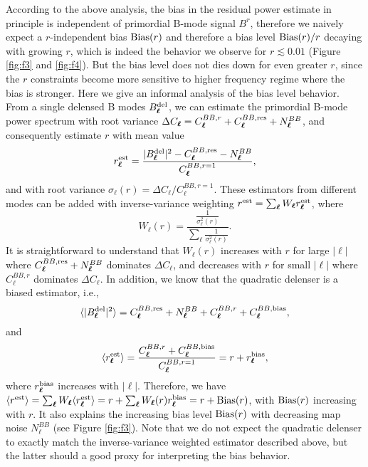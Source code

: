 \documentclass[aps, prd, reprint, nofootinbib, groupedaddress, showpacs]{revtex4-1}
\def\be{\begin{equation}}
\def\ee{\end{equation}}
\newcommand*\Bell{\ensuremath{\boldsymbol\ell}}
\begin{document}
According to the above analysis, the bias in the residual power estimate
in principle is independent of primordial B-mode signal $B^r$,
therefore we naively expect a $r$-independent bias ${\rm Bias}(r)$
and therefore a bias level ${\rm Bias}(r)/r$ decaying with growing $r$,
which is indeed the behavior we observe for
$r\lesssim 0.01$ (Figure \ref{fig:f3} and \ref{fig:f4}).
But the bias level does not dies down for even greater $r$,
since the $r$ constraints become more sensitive to higher frequency
regime where the bias is stronger. Here we give an informal analysis
of the  bias level behavior.
From a single delensed B modes $B^{\rm del}_{\Bell}$,
we can estimate the primordial B-mode power spectrum
with root variance $\Delta C_{\Bell} = C^{BB,r}_{\Bell} + C^{BB,{\rm res}}_{\Bell} + N^{BB}_{\Bell}$,
and  consequently estimate $r$ with mean value
\be
r^{\rm est}_{\Bell} = \frac{|B^{\rm del}_{\Bell}|^2 - C^{BB,{\rm res}}_{\Bell}- N^{BB}_{\Bell}}{C^{BB,r=1}_{\Bell}},
\ee
and
with root variance $\sigma_{\Bell}(r) = \Delta C_{\Bell}/C^{BB,r=1}_{\Bell}$.
These estimators from different modes can be added with inverse-variance weighting
$r^{\rm est} = \sum_{\Bell} W_{\Bell} r^{\rm est}_{\Bell}$,
where
\be
W_{\Bell}(r) = \frac{\frac{1}{\sigma^2_{\Bell}(r)}}{\sum_{\Bell} \frac{1}{\sigma^2_{\Bell}(r)}}.
\ee
It is straightforward to understand that  $W_{\Bell}(r)$ increases with $r$ for large $|{\Bell}|$
where $C^{BB,{\rm res}}_{\Bell}+ N^{BB}_{\Bell}$ dominates $\Delta C_{\Bell}$,
and decreases with $r$ for small $|{\Bell}|$ where $C^{BB,r}_{\Bell} $ dominates $\Delta C_{\Bell}$.
In addition, we know that the quadratic delenser is a biased estimator, i.e.,
\be
\langle |B^{\rm del}_{\Bell}|^2 \rangle = C^{BB,{\rm res}}_{\Bell} + N^{BB}_{\Bell} + C^{BB,r}_{\Bell} + C^{BB,{\rm bias}}_{\Bell},
\ee
and
\be
\langle r^{\rm est}_{\Bell} \rangle = \frac{C^{BB,r}_{\Bell} + C^{BB,{\rm bias}}_{\Bell} }{C^{BB,r=1}_{\Bell}}
= r + r^{\rm bias}_{\Bell},
\ee
where $r^{\rm bias}_{\Bell}$ increases with $|{\Bell}|$.
Therefore, we have $\langle r^{\rm est}\rangle
= \sum_{\Bell} W_{\Bell} \langle r^{\rm est}_{\Bell}\rangle
= r   + \sum_{\Bell} W_{\Bell}(r) r^{\rm bias}_{\Bell}
= r   + {\rm Bias}(r)$,
with ${\rm Bias}(r)$ increasing with $r$.
It also explains the increasing bias level ${\rm Bias}(r)$ with
decreasing map noise $N^{BB}_{\Bell}$ (see Figure \ref{fig:f3}).
Note that we do not expect the quadratic delenser
to exactly match the inverse-variance weighted estimator described above, but the latter
should a good proxy for interpreting the bias behavior.
\end{document}
